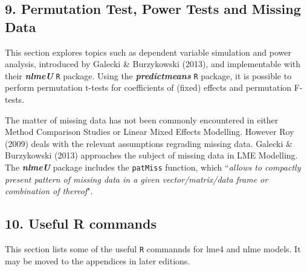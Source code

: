 \documentclass[Main.tex]{subfiles}
\begin{document}
\subsection*{9. Permutation Test, Power Tests and Missing Data }

This section explores topics such as dependent variable simulation and power analysis, introduced by Galecki \& Burzykowski (2013), and implementable with their \textbf{\textit{nlmeU}} \texttt{R} package.
Using the \textbf{\textit{predictmeans}} \texttt{R} package, it is possible to perform permutation t-tests for coefficients of (fixed) effects and permutation F-tests.

The matter of missing data has not been commonly encountered in either Method Comparison Studies or Linear Mixed Effects Modelling. However Roy (2009) deals with the relevant assumptions regrading missing data. Galecki \& Burzykowski (2013) approaches the subject of missing data in LME Modelling. The \textbf{\textit{nlmeU}} package includes the \texttt{patMiss} function, which ``\textit{allows to compactly present pattern of missing data in a given vector/matrix/data
frame or combination of thereof}".



\subsection*{10. Useful R commands }
This section lists some of the useful \texttt{R} commannds for lme4 and nlme models. It may be moved to the appendices in later editions.


\end{document}
